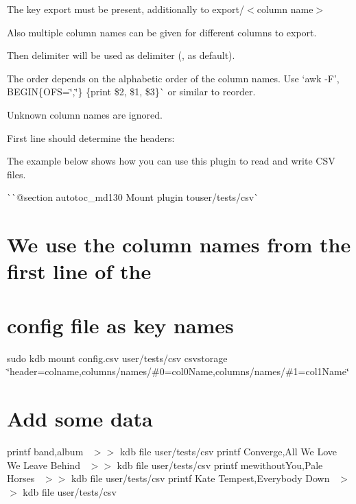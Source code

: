 \begin{DoxyItemize}
\item The key {\ttfamily export} must be present, additionally to {\ttfamily export/$<$column name$>$}
\item Also multiple column names can be given for different columns to export.
\begin{DoxyItemize}
\item Then {\ttfamily delimiter} will be used as delimiter ({\ttfamily ,} as default).
\item The order depends on the alphabetic order of the column names. Use `awk -\/F',\textquotesingle{} \textquotesingle{}B\+E\+G\+IN\{O\+FS=\char`\"{},\char`\"{}\} \{print \$2, \$1, \$3\}\textquotesingle{}\`{} or similar to reorder.
\item Unknown column names are ignored.
\end{DoxyItemize}
\end{DoxyItemize}

First line should determine the headers\+:


\begin{DoxyCode}{0}
\end{DoxyCode}


The example below shows how you can use this plugin to read and write C\+SV files.

\`{}\`{}{\ttfamily  @section autotoc\+\_\+md130 Mount plugin to}user/tests/csv\`{} \hypertarget{autotoc_md126_autotoc_md131}{}\section{We use the column names from the first line of the}\label{autotoc_md126_autotoc_md131}
\hypertarget{autotoc_md126_autotoc_md132}{}\section{config file as key names}\label{autotoc_md126_autotoc_md132}
sudo kdb mount config.\+csv user/tests/csv csvstorage \char`\"{}header=colname,columns/names/\#0=col0\+Name,columns/names/\#1=col1\+Name\char`\"{}\hypertarget{autotoc_md126_autotoc_md133}{}\section{Add some data}\label{autotoc_md126_autotoc_md133}
printf \textquotesingle{}band,album~\newline
\textquotesingle{} $>$$>$ {\ttfamily kdb file user/tests/csv} printf \textquotesingle{}Converge,All We Love We Leave Behind~\newline
\textquotesingle{} $>$$>$ {\ttfamily kdb file user/tests/csv} printf \textquotesingle{}mewithout\+You,Pale Horses~\newline
\textquotesingle{} $>$$>$ {\ttfamily kdb file user/tests/csv} printf \textquotesingle{}Kate Tempest,Everybody Down~\newline
\textquotesingle{} $>$$>$ {\ttfamily kdb file user/tests/csv}

